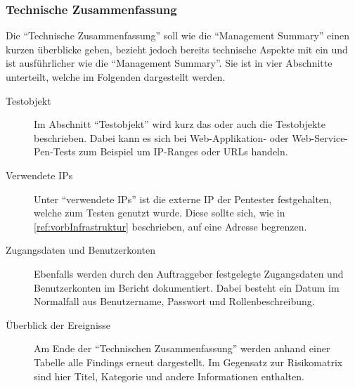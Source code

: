 	\subsubsection{Technische Zusammenfassung}\label{ref:penBerTechZum}
	Die "`Technische Zusammenfassung"' soll wie die "`Management Summary"' einen kurzen überblicke geben, bezieht jedoch bereits technische Aspekte mit ein und ist ausführlicher wie die "`Management Summary"'. Sie ist in vier Abschnitte unterteilt, welche im Folgenden dargestellt werden.
	
	\begin{description}
		\item[Testobjekt] Im Abschnitt	 "`Testobjekt"' wird kurz das oder auch die Testobjekte beschrieben. Dabei kann es sich bei Web-Applikation- oder Web-Service-Pen-Tests zum Beispiel um IP-Ranges oder URLs handeln.
		\item[Verwendete IPs] Unter "`verwendete IPs"' ist die externe IP der Pentester festgehalten, welche zum Testen genutzt wurde. Diese sollte sich, wie in \ref{ref:vorbInfrastruktur} beschrieben, auf eine Adresse begrenzen.
		\item[Zugangsdaten und Benutzerkonten] Ebenfalls werden durch den Auftraggeber festgelegte Zugangsdaten und Benutzerkonten im Bericht dokumentiert. Dabei besteht ein Datum im Normalfall aus Benutzername, Passwort und Rollenbeschreibung.
		\item[Überblick der Ereignisse] Am Ende der "`Technischen Zusammenfassung"' werden anhand einer Tabelle alle Findings erneut dargestellt. Im Gegensatz zur Risikomatrix sind hier Titel, Kategorie und andere Informationen enthalten.
	\end{description}
		
